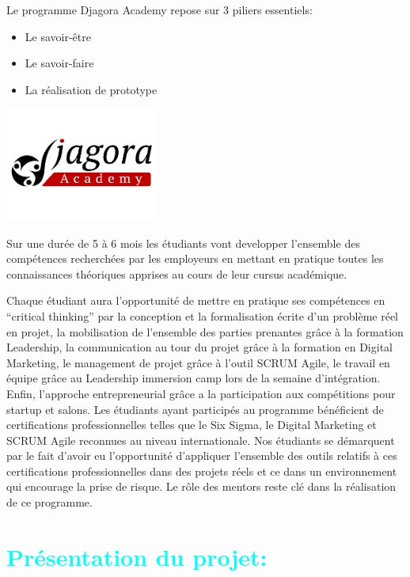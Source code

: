 Le programme Djagora Academy repose sur 3 piliers essentiels:\par
\begin{itemize}
    \item Le savoir-être
    \item Le savoir-faire
    \item La réalisation de prototype
\end{itemize}\par
\begin{center}
    \includegraphics[width=5cm]{images/djagoraAcademy.png}\\
\end{center}
Sur une durée de 5 à 6 mois les étudiants vont developper l’ensemble des compétences recherchées par les employeurs en mettant en pratique toutes les connaissances théoriques apprises au cours de leur cursus académique.\par
Chaque étudiant aura l’opportunité de mettre en pratique ses compétences en “critical thinking” par la conception et la formalisation écrite d’un problème réel en projet, la mobilisation de l’ensemble des parties prenantes grâce à la formation Leadership, la communication au tour du projet grâce à la formation en Digital Marketing, le management de projet grâce à l’outil SCRUM Agile, le travail en équipe grâce au Leadership immersion camp lors de la semaine d’intégration. Enfin, l’approche entrepreneurial grâce a la participation aux compétitions pour startup et salons. Les étudiants ayant participés au programme bénéficient de certifications professionnelles telles que le Six Sigma, le Digital Marketing et SCRUM Agile reconnues au niveau internationale. Nos étudiants se démarquent par le fait d’avoir eu l’opportunité d’appliquer l’ensemble des outils relatifs à ces certifications professionnelles dans des projets réels et ce dans un environnement qui encourage la prise de risque. Le rôle des mentors reste clé dans la réalisation de ce programme.\par
\section{\textcolor{cyan}{Présentation du projet:}}
